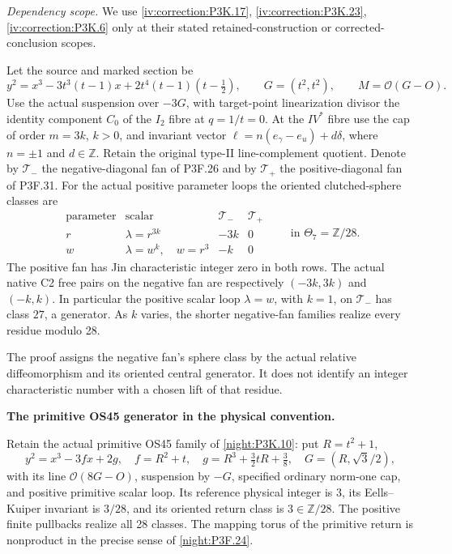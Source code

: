 \begin{theorem}\hypertarget{tag-02VC}{}\label{night:P3K.65}

\par\noindent\textit{Dependency scope.} We use \cref{iv:correction:P3K.17}, \cref{iv:correction:P3K.23}, \cref{iv:correction:P3K.6} only at their stated retained-construction or corrected-conclusion scopes.


Let the source and marked section be
\[
 y^2=x^3-3t^3(t-1)x+2t^4(t-1)(t-\tfrac12),\qquad
 G=(t^2,t^2),\qquad M=\mathcal O(G-O).
\]
Use the actual suspension over \(-3G\), with target-point
linearization divisor the identity component \(C_0\) of the
\(I_2\) fibre at \(q=1/t=0\). At the \(IV^*\) fibre use the
cap of order \(m=3k\), \(k>0\), and invariant vector
\(\ell=n(e_\gamma-e_u)+d\delta\), where \(n=\pm1\) and
\(d\in\mathbb Z\). Retain the original type-II line-complement
quotient. Denote by \(\mathcal T_-\) the negative-diagonal fan
of P3F.26 and by \(\mathcal T_+\) the positive-diagonal fan of
P3F.31. For the actual positive parameter loops the oriented
clutched-sphere classes are
\[
\begin{array}{c|c|c|c}
 \text{parameter}&\text{scalar}&\mathcal T_-&\mathcal T_+\\ \hline
 r&\lambda=r^{3k}&-3k&0\\
 w&\lambda=w^k,\quad w=r^3&-k&0
\end{array}\qquad\text{in }\Theta_7=\mathbb Z/28.       \tag{P3K.65.OR.1}
\]
The positive fan has Jin characteristic integer zero in both rows.
The actual native C2 free pairs on the negative fan are respectively
\((-3k,3k)\) and \((-k,k)\). In particular the positive scalar
loop \(\lambda=w\), with \(k=1\), on \(\mathcal T_-\) has class
\(27\), a generator. As \(k\) varies, the shorter negative-fan
families realize every residue modulo 28.

The proof assigns the negative fan's sphere class by the actual
relative diffeomorphism and its oriented central generator. It does
not identify an integer characteristic number with a chosen lift of
that residue.
\end{theorem}

\begin{proposition}\hypertarget{tag-01TZ}{}\label{iv:correction:P3K.10}

\textbf{The primitive OS45 generator in the physical convention.}\par
Retain the actual primitive OS45 family of
\cref{night:P3K.10}: put \(R=t^2+1\),
\[
 y^2=x^3-3fx+2g,\quad f=R^2+t,\quad
 g=R^3+\tfrac32tR+\tfrac38,\quad G=(R,\sqrt3/2),
\]
with its line \(\mathcal O(8G-O)\), suspension by \(-G\), specified
ordinary norm-one cap, and positive primitive scalar loop. Its
reference physical integer is \(3\), its Eells--Kuiper invariant is
\(3/28\), and its oriented return class is \(3\in\mathbb Z/28\).
The positive finite pullbacks realize all 28 classes. The mapping
torus of the primitive return is nonproduct in the precise sense of
\cref{night:P3F.24}.
\end{proposition}

